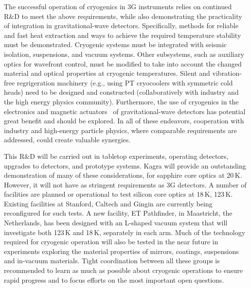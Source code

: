 The successful operation of cryogenics in 3G instruments relies on continued R\&D
to meet the above requirements, while also demonstrating the practicality of integration in gravitational-wave detectors. Specifically, methods for reliable and fast heat extraction and ways to achieve the required temperature stability must be demonstrated. Cryogenic systems must be integrated with seismic isolation, suspensions, and vacuum systems.  
Other subsystems, such as auxiliary optics for wavefront control, must be modified to take into account the changed material and optical properties at cryogenic temperatures. Silent and vibration-free regrigeration machinery (e.g., using PT cryocoolers with symmetric cold heads) need to be designed and constructed (collaboratively with industry and the high energy physics community). Furthermore, the use of cryogenics in the electronics and magnetic actuators~\cite{cryo:OSEM} of gravitational-wave detectors has potential great benefit and should be explored. In all of these endeavors, cooperation with industry and high-energy particle physics, where comparable requirements are addressed, could create valuable synergies. 


This R\&D will be carried out in tabletop experiments, operating detectors, upgrades to detectors, and prototype systems. Kagra will provide an outstanding demonstration of many of these considerations, for sapphire core optics at 20\,K. However, it will not have as stringent requirements as 3G detectors.
A number of facilities are planned or operational to test silicon core optics at 18\,K, 123\,K. 
Existing facilities at Stanford, Caltech and Gingin are currently being reconfigured for such tests. A new facility, ET Pathfinder, in Maastricht, the Netherlands, has been designed with an L-shaped vacuum system that will investigate both 123\,K and  18\,K, separately in each arm. Much of the technology required for cryogenic operation will also be tested in the near future in experiments exploring the material properties of mirrors, coatings, suspensions and in-vacuum materials. Tight coordination between all these groups is recommended to learn as much as possible about cryogenic operations to ensure rapid progress and to focus efforts on the most important open questions.

